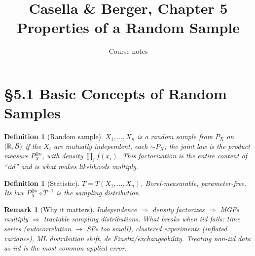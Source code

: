 \documentclass[11pt]{article}
\title{Casella \& Berger, Chapter 5\\[2pt]\large Properties of a Random Sample}
\author{Course notes}\date{}
\newtheorem{definition}[theorem]{Definition}
\newtheorem{remark}[theorem]{Remark}
\begin{document}
\maketitle

\section{\S5.1 Basic Concepts of Random Samples}
\begin{definition}[Random sample]
$X_1,\dots,X_n$ is a random sample from $P_X$ on $(\mathbb{R},\mathcal B)$ if the $X_i$ are mutually independent, each $\sim P_X$; the joint law is the product measure $P_X^{\otimes n}$, with density $\prod_i f(x_i)$. This factorization is the entire content of ``iid'' and is what makes likelihoods multiply.
\end{definition}
\begin{definition}[Statistic]
$T=T(X_1,\dots,X_n)$, Borel-measurable, parameter-free. Its law $P_X^{\otimes n}\circ T^{-1}$ is the \emph{sampling distribution}.
\end{definition}
\begin{remark}[Why it matters]
Independence $\Rightarrow$ density factorizes $\Rightarrow$ MGFs multiply $\Rightarrow$ tractable sampling distributions. What breaks when iid fails: time series (autocorrelation $\to$ SEs too small), clustered experiments (inflated variance), ML distribution shift, de Finetti/exchangeability. Treating non-iid data as iid is the most common applied error.
\end{remark}
\end{document}
